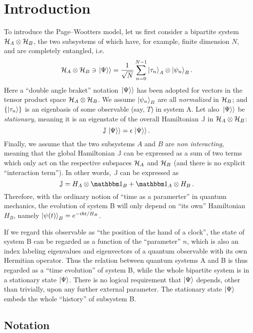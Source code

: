 \section{Introduction}

To introduce the Page--Wootters model, let us first consider
a bipartite system $\mathcal{H}_A \otimes \mathcal{H}_B$,
the two subsystems of which have, for example, finite dimension $N$,
and are completely
entangled, i.e.
$$
  \mathcal{H}_A \otimes \mathcal{H}_B \ni \left.\left| \Psi \right\rangle\right\rangle
  =
  \frac{1}{\sqrt{N}} \sum_{n=0}^{N-1} \ket{\tau_{n}}_{A} \otimes \ket{\psi_{n}}_{B} \text{.}
$$
Here
a ``double angle braket'' notation $\left.\left| \Psi \right\rangle\right\rangle$ has been adopted
for vectors in the tensor product space $\mathcal{H}_A \otimes \mathcal{H}_B$.
We assume $\ket{\psi_{n}}_{B}$ are all \emph{normalized} in $\mathcal{H}_B$;
and
$\qty{\ket{{\tau}_n}}$ is an eigenbasis of some observable (say, $T$) in system A.
Let also $\left.\left| \Psi \right\rangle\right\rangle$ be \emph{stationary}, meaning it is an eigenstate
of the overall Hamiltonian $\mathbb{J}$ in $\mathcal{H}_A \otimes \mathcal{H}_B$:
$$
  \mathbb{J} \left.\left| \Psi \right\rangle\right\rangle = \epsilon \left.\left| \Psi \right\rangle\right\rangle \text{.}
$$
Finally, we assume that the two subsystems $A$ and $B$ are \emph{non interacting},
meaning that the global Hamiltonian $\mathbb{J}$ can be expressed as a sum of two terms
which only act on the respective subspaces $\mathcal{H}_A$ and $\mathcal{H}_B$
(and there is no explicit ``interaction term''). In other words,
$\mathbb{J}$ can be expressed as
$$
  \mathbb{J} = H_A \ox \idop_B + \idop_A \ox H_B \, \text{.} 
$$
Therefore, with the     ordinary notion of ``time as a paramerter'' in quantum mechanics,
the evolution of system B will only depend on ``its own'' Hamiltonian $H_B$, namely
$\ket{\psi(t)}_B = e^{- i \hbar t / H_B } $. 


If we regard this observable as ``the position of the hand of a clock'',
the state of system B can be regarded as a function of the ``parameter'' $n$,
which is also an index labeling
eigenvalues and eigenvectors of a quantum observable
with its own Hermitian operator.
Thus the relation between quantum systems A and B is thus regarded as
a ``time evolution'' of system B,
while the whole bipartite system
is in a stationary state
$\ket{\Psi}$.
There is no logical requirement that $\ket{\Psi}$
depends, other than trivially,
upon any further external parameter.
The stationary state $\ket{\Psi}$ embeds the whole ``history''
of subsystem B.

\subsection*{Notation}

